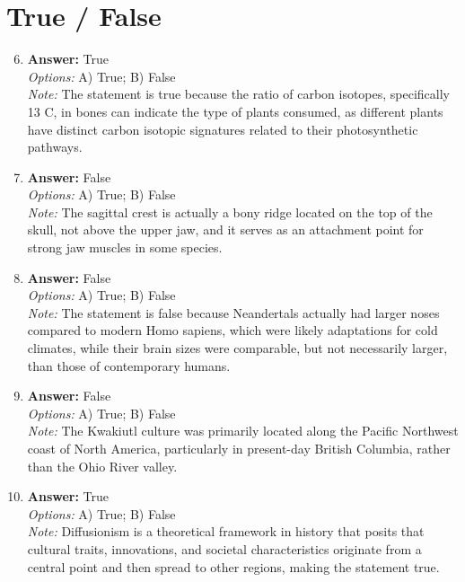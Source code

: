 \documentclass[12pt]{article}
\begin{document}
\section*{True / False}
\begin{enumerate}[label=\arabic*.]
\setcounter{enumi}{5}
\item \textbf{Answer:} True
\\ \textit{Options:} A) True; B) False
\\ \textit{Note:} The statement is true because the ratio of carbon isotopes, specifically 13 C, in bones can indicate the type of plants consumed, as different plants have distinct carbon isotopic signatures related to their photosynthetic pathways.
\item \textbf{Answer:} False
\\ \textit{Options:} A) True; B) False
\\ \textit{Note:} The sagittal crest is actually a bony ridge located on the top of the skull, not above the upper jaw, and it serves as an attachment point for strong jaw muscles in some species.
\item \textbf{Answer:} False
\\ \textit{Options:} A) True; B) False
\\ \textit{Note:} The statement is false because Neandertals actually had larger noses compared to modern Homo sapiens, which were likely adaptations for cold climates, while their brain sizes were comparable, but not necessarily larger, than those of contemporary humans.
\item \textbf{Answer:} False
\\ \textit{Options:} A) True; B) False
\\ \textit{Note:} The Kwakiutl culture was primarily located along the Pacific Northwest coast of North America, particularly in present-day British Columbia, rather than the Ohio River valley.
\item \textbf{Answer:} True
\\ \textit{Options:} A) True; B) False
\\ \textit{Note:} Diffusionism is a theoretical framework in history that posits that cultural traits, innovations, and societal characteristics originate from a central point and then spread to other regions, making the statement true.
\end{enumerate}
\end{document}
